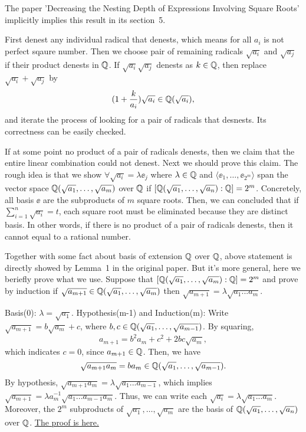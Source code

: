 \documentclass[12pt]{article}
\begin{document}
\begin{Proof}
  The paper 'Decreasing the Nesting Depth of Expressions
  Involving Square Roots' implicitly implies this result in its
  section~5.

  First denest any individual radical that denests, which means for
  all $a_i$ is not perfect sqaure number. Then we choose pair of
  remaining radicals $\sqrt{a_i}$ and $\sqrt{a_j}$ if their product
  denests in $\mathbb{Q}$. If $\sqrt{a_i} \sqrt{a_j}$ denests as
  $k \in \mathbb{Q}$, then replace $\sqrt{a_i} + \sqrt{a_j}$ by
  $$
  (1 + \frac{k}{a_i})\sqrt{a_i} \in \mathbb{Q}(\sqrt{a_i}),
  $$
  and iterate the process of looking for a pair of radicals that
  desnests. Its correctness can be easily checked.

  If at some point no product of a pair of radicals denests, then we
  claim that the entire linear combination could not denest. Next
  we should prove this claim. The rough idea is that we show
  $\forall \sqrt{a_i} = \lambda \ee_j$ where $\lambda \in \mathbb{Q}$ and
  $\langle \ee_1, \dots,
  \ee_{2^m} \rangle$ span the vector space $\mathbb{Q}(\sqrt{a_1}, \dots,
  \sqrt{a_m})$ over $\mathbb{Q}$ if $
  [\mathbb{Q}(\sqrt{a_1}, \dots, \sqrt{a_n}):\mathbb{Q}] = 2^m$. Concretely, all
  basis $\ee$ are the subproducts of $m$ square roots. Then, we can
  concluded that if $\sum_{i=1}^n \sqrt{a_i} = t$, each square root
  must be eliminated because they are distinct basis. In other
  words, if there is no product of a pair of radicals denests, then
  it cannot equal to a rational number.

  Together with some fact about basis of extension $\mathbb{Q}$ over $\mathbb{Q}$,
  above statement is directly showed by Lemma~1 in the original
  paper. But it's more general, here we beriefly prove
  what we use.
  Suppose that $[\mathbb{Q}(\sqrt{a_1},\dots,\sqrt{a_m}):\mathbb{Q}] = 2^m$ and
  prove by induction if
  $\sqrt{a_{m+1}} \in \mathbb{Q}(\sqrt{a_1},\dots,\sqrt{a_m})$ then
  $\sqrt{a_{m+1}} = \lambda \sqrt{a_1...a_m}$.

  Basis(0): $\lambda = \sqrt{a_1}$.
  Hypothesis(m-1) and Induction(m): Write $\sqrt{a_{m+1}} =
  b\sqrt{a_{m}} + c$, where $b, c \in \mathbb{Q}(\sqrt{a_1},\dots,
  \sqrt{a_{m-1}})$. By squaring,
  $$
  a_{m+1} = b^2a_m + c^2 + 2bc\sqrt{a_m},
  $$
  which indicates $c = 0$, since $a_{m+1} \in \mathbb{Q}$. Then, we have
  $$
  \sqrt{a_{m+1}a_m} = ba_{m} \in \mathbb{Q}(\sqrt{a_1},\dots,\sqrt{a_{m-1}}).
  $$
  By hypothesis, $\sqrt{a_{m+1}a_m} = \lambda \sqrt{a_1...a_{m-1}}$,
  which implies $\sqrt{a_{m+1}} = \lambda a_m^{-1}
  \sqrt{a_1...a_{m-1}a_{m}}$. Thus, we can write each $\sqrt{a_i}
  = \lambda \sqrt{a_1...a_m}$. Moreover, the $2^m$ subproducts of
  $\sqrt{a_1}, \dots, \sqrt{a_m}$ are the basis of $\mathbb{Q}(\sqrt{a_1},
  \dots,\sqrt{a_n})$ over $\mathbb{Q}$. \href{https://math.stackexchange.com/questions/30687/the-square-roots-of-different-primes-are-linearly-independent-over-the-field-of}{The proof is here.}

  
\end{Proof}
\end{document}
